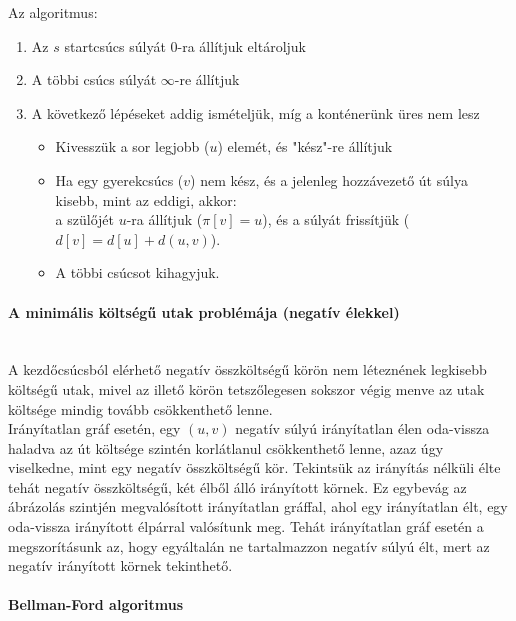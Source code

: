 \documentclass[margin=0px]{article}
\begin{document}
	\noindent Az algoritmus:
    \begin{enumerate}
        \item Az $s$ startcsúcs súlyát 0-ra állítjuk eltároljuk
        \item A többi csúcs súlyát $\infty$-re állítjuk
		\item A következő lépéseket addig ismételjük, míg a konténerünk üres nem lesz
        \begin{itemize}
            \item Kivesszük a sor legjobb ($u$) elemét, és "kész"-re állítjuk
            \item Ha egy gyerekcsúcs ($v$) nem kész, és a jelenleg hozzávezető út súlya kisebb, mint az eddigi, akkor:\\
            a szülőjét $u$-ra állítjuk ($\pi[v] = u$), és a súlyát frissítjük ($d[v] = d[u]+d(u,v)$).
			\item A többi csúcsot kihagyjuk.
        \end{itemize}
	\end{enumerate}						

    \paragraph*{A minimális költségű utak problémája (negatív élekkel)\\\\}

    \noindent A kezdőcsúcsból elérhető negatív összköltségű körön nem léteznének legkisebb költségű utak, mivel az illető körön tetszőlegesen sokszor végig menve az utak költsége mindig tovább csökkenthető lenne.\\

    \noindent Irányítatlan gráf esetén, egy $(u,v)$ negatív súlyú irányítatlan élen oda-vissza haladva az út költsége szintén korlátlanul csökkenthető lenne, azaz úgy viselkedne, mint egy negatív összköltségű kör. Tekintsük az irányítás nélküli élte tehát negatív összköltségű, két élből álló irányított körnek. Ez egybevág az ábrázolás szintjén megvalósított irányítatlan gráffal, ahol egy irányítatlan élt, egy oda-vissza irányított élpárral valósítunk meg. Tehát irányítatlan gráf esetén a megszorításunk az, hogy egyáltalán ne tartalmazzon negatív súlyú élt, mert az negatív irányított körnek tekinthető.
					
    \paragraph*{Bellman-Ford algoritmus\\\\}
\end{document}
